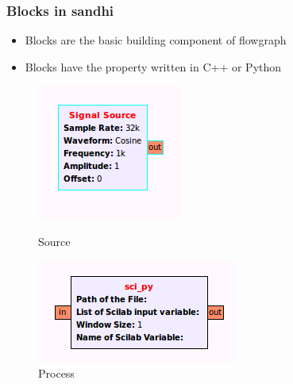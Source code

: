 \documentclass{beamer}
\begin{document}
\begin{frame}
        \frametitle{Blocks in sandhi}
        \begin{itemize}
	\item Blocks are the basic building component of flowgraph
	\item Blocks have the property written in C++ or Python
        \end{itemize}
\begin{figure}
        \centering
        \begin{minipage}{.3\textwidth}
            \centering
            \includegraphics[width=.9\linewidth]{source_block.png}
            \caption{Source}
        \end{minipage}%
        \begin{minipage}{.3\textwidth}
            \centering
            \includegraphics[width=.9\linewidth]{process_block.png}
            \caption{Process}
        \end{minipage}%

\end{figure}
\end{frame}
\end{document}
